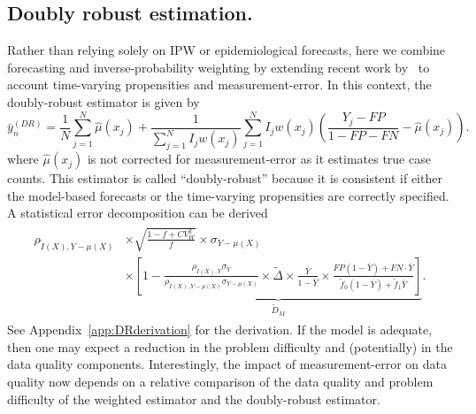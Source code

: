 \documentclass[11pt]{amsart}
\numberwithin{equation}{section}
\theoremstyle{plain}
\begin{document}


 \subsection{Doubly robust estimation.}
 Rather than relying solely on IPW or epidemiological forecasts, here we combine forecasting and inverse-probability weighting by extending recent work by~\cite{Chen2019} to account time-varying propensities and measurement-error. In this context, the doubly-robust estimator is given by
 $$
 \bar y_{n}^{(DR)} = \frac{1}{N} \sum_{j=1}^N \hat \mu (x_j) + \frac{1}{\sum_{j=1}^N I_j w (x_j)} \sum_{j=1}^N I_j w(x_j) \left( \frac{Y_j - FP}{1 - FP - FN} - \hat \mu(x_j) \right).
 $$
 where $\hat \mu(x_j)$ is not corrected for measurement-error as it estimates true case counts. This estimator is called ``doubly-robust'' because it is consistent if either the model-based forecasts or the time-varying propensities are correctly specified. A statistical error decomposition can be derived
 \begin{align}
 \label{eq:statdecomp3}
 \begin{split}
 \rho_{\tilde I (X), Y-\mu(X)} &\times \sqrt{\frac{1-f+ CV^2_W}{f}} \times \sigma_{Y-\mu(X)}  \\
 &\times \underbrace{\left[ 1 - \frac{\rho_{\tilde I(X),Y} \sigma_{Y}}{\rho_{\tilde I(X),Y-\mu(X)} \sigma_{Y-\mu(X)}} \times \tilde \Delta \times \frac{\bar Y}{1-\bar Y} \times \frac{FP(1-\bar Y) + FN \cdot \bar Y}{\tilde f_0 (1-\bar Y) + \tilde f_1 \bar Y} \right]}_{\tilde D_M}.
 \end{split}
 \end{align}
 See Appendix~\ref{app:DRderivation} for the derivation.
 If the model is adequate, then one may expect a reduction in the problem difficulty and (potentially) in the data quality components.
 Interestingly, the impact of measurement-error on data quality now depends on a relative comparison of the data quality and problem difficulty of the weighted estimator and the doubly-robust estimator.
\end{document}
